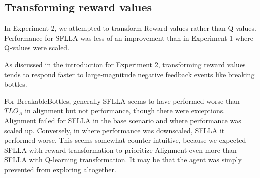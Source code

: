 



\subsection{Transforming reward values}

In Experiment 2, we attempted to transform Reward values rather than Q-values. Performance for SFLLA was less of an improvement than in Experiment 1 where Q-values were scaled.

As discussed in the introduction for Experiment 2, transforming reward values tends to respond faster to large-magnitude negative feedback events like breaking bottles. 

For BreakableBottles, generally SFLLA seems to have performed worse than $TLO_A$ in alignment but not performance, though there were exceptions. Alignment failed for SFLLA in the base scenario and where performance was scaled up. Conversely, in where performance was downscaled, SFLLA it performed worse. This seems somewhat counter-intuitive, because we expected SFLLA with reward transformation to prioritize Alignment even more than SFLLA with Q-learning transformation. It may be that the agent was simply prevented from exploring altogether.


